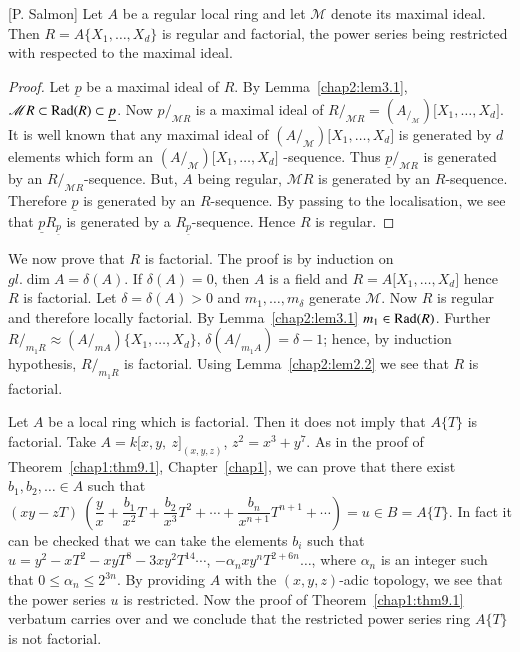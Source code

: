 \setcounter{theorem}{1}
    \begin{theorem}\label{chap2:thm3.2}[P. Salmon]%
Let $A$ be a regular local ring and let
        $\mathscr{M}$ denote its maximal ideal. Then $R = A \{X_1,
        \ldots , X_d\}$ is regular and factorial, the power series
        being restricted with respected to the maximal ideal. 
    \end{theorem}  
      
\begin{proof}
Let $\underline{p}$ be a maximal ideal of $R$. By Lemma~\ref{chap2:lem3.1},
$\mathscr{M} R \subset \operatorname{Rad} (R) \subset \underline{p}$. Now
$p/_{\mathscr{M}R}$ is a maximal ideal of $R/_{\mathscr{M}R}=
(A_{/_{\mathscr{M}}}) \big[ X_1, \ldots , X_d \big]$. It is well
known that any maximal ideal of $(A{/_{\mathscr{M}}}) \big[X_1,
  \ldots , X_d \big]$ is generated  by $d$\pageoriginale elements
which form an 
$(A{/_{\mathscr{M}}}) \big[X_1, \ldots, X_d \big]$ -sequence. Thus
$\underline{p}/_{\mathscr{M}R}$ is generated by an
$R{/_{\mathscr{M}R}}$-sequence. But, $A$ being regular, $\mathscr{M} R$ is
generated by an $R$-sequence. Therefore $\underline{p}$ is generated by
an $R$-sequence. By passing to the localisation, we see that
$\underline{p} R_{\underline{p}}$ is generated by a
$R_{\underline{p}}$-sequence. Hence $R$ is regular. 
    \end{proof}    
    
    We now prove that $R$ is factorial. The proof is by induction on
    $gl. \dim A= \delta (A)$. If $\delta (A)= 0$, then $A$ is a field
    and $R = A \big[ X_1, \ldots , X_d \big]$ hence $R$ is
    factorial. Let $\delta = \delta (A) > 0$ and $m_1, \ldots ,
    m_\delta$ generate $\mathscr{M}$. Now $R$ is regular and therefore
    locally factorial. By Lemma~\ref{chap2:lem3.1} $m_1 \in \operatorname{Rad}
    (R)$. Further 
    $R{/_{m_1 R}} \approx (A/_{m A}) \big\{X_1, \ldots , X_d
    \big\}$, $\delta (A{/_{m_1 A}}) = \delta - 1$; hence, by induction
    hypothesis, $R{/_{m_1 R}}$ is factorial. Using 
    Lemma~\ref{chap2:lem2.2} we see  
    that $R$ is factorial. 
    
    \setcounter{rem}{0}
    \begin{rem} %
Let $A$ be a local ring which is factorial. Then it does not imply
that $A\{T\}$ is factorial. Take $A = k \big[x, y, ~ z \big]_{(x, y,
  z)}$, $z^2 = x^3 + y^7$. As in the proof of Theorem~\ref{chap1:thm9.1}, 
Chapter~\ref{chap1}, 
we can prove that there exist $b_1, b_2 , \ldots \in A$ such that $(xy
- z T) ~ (\dfrac{y}{x} + \dfrac{b_1}{x^2} T + \dfrac{b_2}{x^3} T^2 +
\cdots + \dfrac{b_n}{x^{n+1}} T^{n+1} + \cdots) = u \in B = A
\{T\}$. In fact it can be checked that we can take the elements $b_i$
such that $u = y^2 - x T^2 - xy T^8 - 3x y^2 T^{14} \cdots$, $- \alpha_n
xy^n T^{2+6n} \ldots$, where $\alpha_n$ is an integer such that $0
\le \alpha_n \le 2^{3n}$. By providing $A$ with the $(x, y, z)$-adic
topology, we see that the power series $u$ is restricted. Now the
proof of Theorem~\ref{chap1:thm9.1} verbatum carries over and we
conclude that the restricted power series ring $A \{T\}$ is not
factorial.   
\end{rem} 
       
